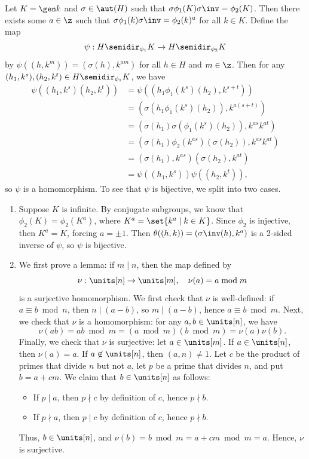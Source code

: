 \begin{sol}
    Let $K = \gen k$ and $\sigma \in \aut(H)$ such that $\sigma\phi_1(K)\sigma\inv = \phi_2(K)$. Then there exists some $a \in \z$ such that $\sigma\phi_1(k)\sigma\inv = \phi_2(k)^a$ for all $k \in K$. Define the map
    \[\psi : H \semidir_{\phi_1} K \to H \semidir_{\phi_2} K\]
    by $\psi((h, k^m)) = (\sigma(h), k^{am})$ for all $h \in H$ and $m \in \z$. Then for any $(h_1, k^s), (h_2, k^t) \in H \semidir_{\phi_1} K$, we have
    \begin{align*}
        \psi((h_1, k^s)(h_2, k^t)) & = \psi((h_1\phi_1(k^s)(h_2), k^{s + t})) \\
        & = (\sigma(h_1\phi_1(k^s)(h_2)), k^{a(s + t)}) \\
        & = (\sigma(h_1)\sigma(\phi_1(k^s)(h_2)), k^{as}k^{at}) \\
        & = (\sigma(h_1)\phi_2(k^{as})(\sigma(h_2)), k^{as}k^{at}) \\
        & = (\sigma(h_1), k^{as})(\sigma(h_2), k^{at}) \\
        & = \psi((h_1, k^s))\psi((h_2, k^t)),
    \end{align*}
    so $\psi$ is a homomorphism. To see that $\psi$ is bijective, we split into two cases.
    \begin{enumerate}
        \item Suppose $K$ is infinite. By conjugate subgroups, we know that $\phi_2(K) = \phi_2(K^a)$, where $K^a = \set{k^a \mid k \in K}$. Since $\phi_2$ is injective, then $K^a = K$, forcing $a = \pm 1$. Then $\theta((h, k)) = (\sigma\inv(h), k^a)$ is a 2-sided inverse of $\psi$, so $\psi$ is bijective.
        \item We first prove a lemma: if $m \mid n$, then the map defined by
        \[\nu : \units[n] \to \units[m], \quad \nu(a) = a \bmod m\]
        is a surjective homomorphism. We first check that $\nu$ is well-defined: if $a \equiv b \bmod n$, then $n \mid (a - b)$, so $m \mid (a - b)$, hence $a \equiv b \bmod m$. Next, we check that $\nu$ is a homomorphism: for any $a, b \in \units[n]$, we have
        \[\nu(ab) = ab \bmod m = (a \bmod m)(b \bmod m) = \nu(a)\nu(b).\]
        Finally, we check that $\nu$ is surjective: let $a \in \units[m]$. If $a \in \units[n]$, then $\nu(a) = a$. If $a \not\in \units[n]$, then $(a, n) \neq 1$. Let $c$ be the product of primes that divide $n$ but not $a$, let $p$ be a prime that divides $n$, and put $b = a + cm$. We claim that $b \in \units[n]$ as follows:
        \begin{itemize}
            \item If $p \mid a$, then $p \nmid c$ by definition of $c$, hence $p \nmid b$.
            \item If $p \nmid a$, then $p \mid c$ by definition of $c$, hence $p \nmid b$.
        \end{itemize}
        Thus, $b \in \units[n]$, and $\nu(b) = b \bmod m = a + cm \bmod m = a$. Hence, $\nu$ is surjective.
        

\end{enumerate}
\end{sol}
